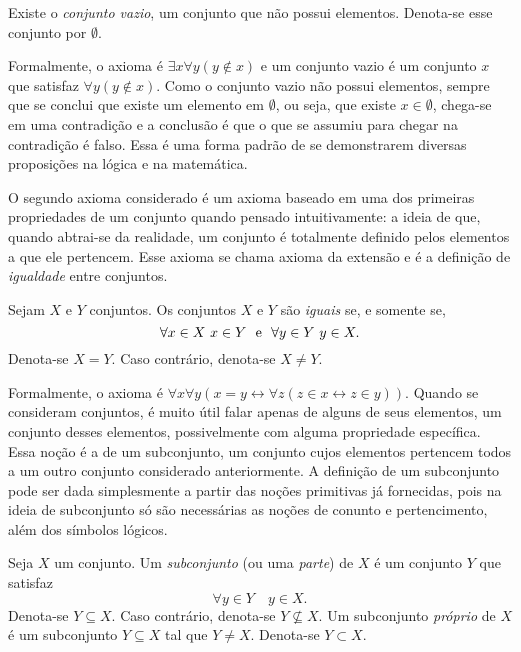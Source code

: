 \begin{axi}[Vazio]
Existe o \emph{conjunto vazio}, um conjunto que não possui elementos. Denota-se esse conjunto por $\emptyset$.
\end{axi}

Formalmente, o axioma é $\exists x \forall y(y \notin x)$  e um conjunto vazio é um conjunto $x$ que satisfaz $\forall y(y \notin x)$. Como o conjunto vazio não possui elementos, sempre que se conclui que existe um elemento em $\emptyset$, ou seja, que existe $x \in \emptyset$, chega-se em uma contradição e a conclusão é que o que se assumiu para chegar na contradição é falso. Essa é uma forma padrão de se demonstrarem diversas proposições na lógica e na matemática.

O segundo axioma considerado é um axioma baseado em uma dos primeiras propriedades de um conjunto quando pensado intuitivamente: a ideia de que, quando abtrai-se da realidade, um conjunto é totalmente definido pelos elementos a que ele pertencem. Esse axioma se chama axioma da extensão e é a definição de \emph{igualdade} entre conjuntos.

\begin{axi}[Extensão]
Sejam $X$ e $Y$ conjuntos. Os conjuntos $X$ e $Y$ são \emph{iguais} se, e somente se, %
	\begin{equation*}
	\forall x \in X \ x \in Y \text{\ \ e\ \ } \forall y \in Y \ y \in X.
	\end{equation*}
Denota-se $X=Y$. Caso contrário, denota-se $X \neq Y$.
\end{axi}

Formalmente, o axioma é $\forall x \forall y (x = y \leftrightarrow \forall z (z \in x \leftrightarrow z \in y))$.  Quando se consideram conjuntos, é muito útil falar apenas de alguns de seus elementos, um conjunto desses elementos, possivelmente com alguma propriedade específica. Essa noção é a de um subconjunto, um conjunto cujos elementos pertencem todos a um outro conjunto considerado anteriormente. A definição de um subconjunto pode ser dada simplesmente a partir das noções primitivas já fornecidas, pois na ideia de subconjunto só são necessárias as noções de conunto e pertencimento, além dos símbolos lógicos.

\begin{defi}
Seja $X$ um conjunto. Um \emph{subconjunto} (ou uma \emph{parte}) de $X$ é um conjunto $Y$ que satisfaz
	\begin{equation*}
	\forall y \in Y \quad y \in X.
	\end{equation*}
Denota-se $Y \subseteq X$. Caso contrário, denota-se $Y \nsubseteq X$. Um subconjunto \emph{próprio} de $X$ é um subconjunto $Y \subseteq X$ tal que $Y \neq X$. Denota-se $Y \subset X$.
\end{defi}

